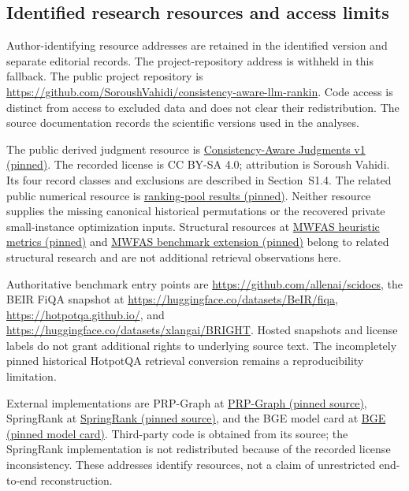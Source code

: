 \documentclass[pdflatex,sn-basic,Numbered]{sn-jnl}
\begin{document}
\subsection{Identified research resources and access limits}
\ifdefined\AnonymousVersion
Author-identifying resource addresses are retained in the identified version and separate editorial records. The project-repository address is withheld in this fallback.
\else
The public project repository is \url{https://github.com/SoroushVahidi/consistency-aware-llm-rankin}. Code access is distinct from access to excluded data and does not clear their redistribution. The source documentation records the scientific versions used in the analyses.

The public derived judgment resource is \href{https://huggingface.co/datasets/SoroushVahidi/consistency-aware-judgments/tree/f9317638ca1cc422661f704168335576d36ca995}{Consistency-Aware Judgments v1 (pinned)}. The recorded license is CC BY-SA 4.0; attribution is Soroush Vahidi. Its four record classes and exclusions are described in Section~S1.4. The related public numerical resource is \href{https://huggingface.co/datasets/SoroushVahidi/ranking-pool-ndcg-results/tree/4d6d9d372c24e541875990923ab5569454b6b44b}{ranking-pool results (pinned)}. Neither resource supplies the missing canonical historical permutations or the recovered private small-instance optimization inputs. Structural resources at \href{https://huggingface.co/datasets/SoroushVahidi/mwfas-heuristic-metrics/tree/5b6cd5620ca0a1c9b3be5e8d996bf8e3c467e79f}{MWFAS heuristic metrics (pinned)} and \href{https://huggingface.co/datasets/SoroushVahidi/mwfas-benchmark-extension/tree/117cd82e5b863238377c5effe7430ce771062cf4}{MWFAS benchmark extension (pinned)} belong to related structural research and are not additional retrieval observations here.
\fi

Authoritative benchmark entry points are \url{https://github.com/allenai/scidocs}, the BEIR FiQA snapshot at \url{https://huggingface.co/datasets/BeIR/fiqa}, \url{https://hotpotqa.github.io/}, and \url{https://huggingface.co/datasets/xlangai/BRIGHT}. Hosted snapshots and license labels do not grant additional rights to underlying source text. The incompletely pinned historical HotpotQA retrieval conversion remains a reproducibility limitation.

External implementations are PRP-Graph at \href{https://github.com/Memelank/PRP-Graph/tree/968e45ee8178f5d3ac44a2b8f11f091af69206d7}{PRP-Graph (pinned source)}, SpringRank at \href{https://github.com/LarremoreLab/SpringRank/tree/f97a489e85e44c553a437e7c6f9e40a800a5ade4}{SpringRank (pinned source)}, and the BGE model card at \href{https://huggingface.co/BAAI/bge-reranker-v2-m3/tree/953dc6f6f85a1b2dbfca4c34a2796e7dde08d41e}{BGE (pinned model card)}. Third-party code is obtained from its source; the SpringRank implementation is not redistributed because of the recorded license inconsistency. These addresses identify resources, not a claim of unrestricted end-to-end reconstruction.
\end{document}
